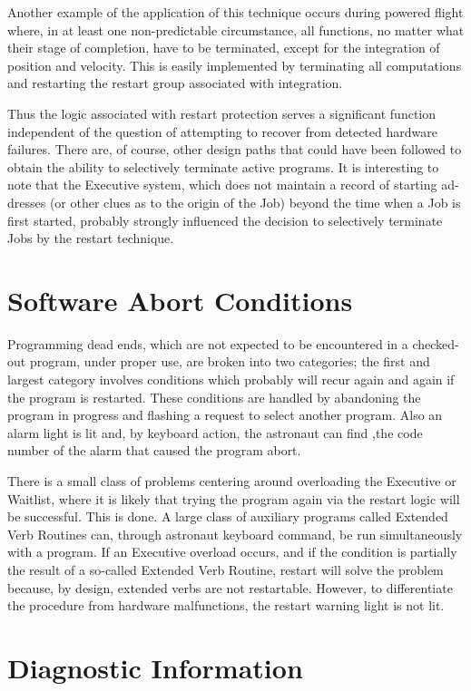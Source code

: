 \documentclass[oxford]{ahsan}
\begin{document}
Another example of the application of this technique occurs during powered flight
where, in at least one non-predictable circumstance, all functions, no matter what
their stage of completion, have to be terminated, except for the integration of
position and velocity. This is easily implemented by terminating all computations and
restarting the restart group associated with integration.

Thus the logic associated with restart protection serves a significant function
independent of the question of attempting to recover from detected hardware failures.
There are, of course, other design paths that could have been followed to obtain the
ability to selectively terminate active programs. It is interesting to note that the
Executive system, which does not maintain a record of starting ad- dresses (or other
clues as to the origin of the Job) beyond the time when a Job is first started,
probably strongly influenced the decision to selectively terminate Jobs by the restart
technique.


\section{Software Abort Conditions}

Programming dead ends, which are not expected to be encountered in a checked-out
program, under proper use, are broken into two categories; the first and largest
category involves conditions which probably will recur again and again if the program
is restarted. These conditions are handled by abandoning the program in progress and
flashing a request to select another program. Also an alarm light is lit and, by
keyboard action, the astronaut can find ,the code number of the alarm that caused the
program abort.

There is a small class of problems centering around overloading the Executive or
Waitlist, where it is likely that trying the program again via the restart logic will
be successful. This is done. A large class of auxiliary programs called Extended Verb
Routines can, through astronaut keyboard command, be run simultaneously with a program.
If an Executive overload occurs, and if the condition is partially the result of a
so-called Extended Verb Routine, restart will solve the problem because, by design,
extended verbs are not restartable. However, to differentiate the procedure from
hardware malfunctions, the restart warning light is not lit.

\section{Diagnostic Information }
\end{document}
